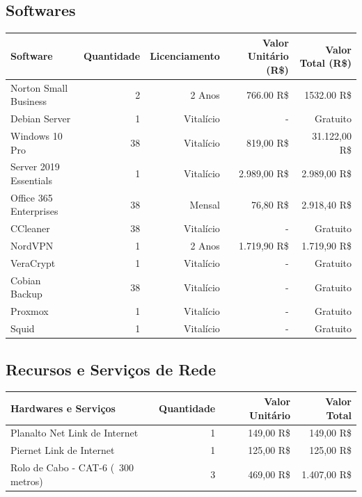 \documentclass[12pt]{article}
\begin{document}
\subsection{Softwares}

\begin{center}
\begin{tabular}{| l | r | r | r | r |}
\hline 
Software & Quantidade & Licenciamento & Valor Unitário (R\$) & Valor Total (R\$)\\
\hline
Norton Small Business & 2 & 2 Anos & 766.00 R\$ & 1532.00 R\$\\
Debian Server & 1 & Vitalício & - & Gratuito\\
Windows 10 Pro & 38 & Vitalício & 819,00 R\$ & 31.122,00 R\$\\
Server 2019 Essentials & 1 & Vitalício & 2.989,00 R\$ & 2.989,00 R\$\\
Office 365 Enterprises & 38 & Mensal & 76,80 R\$ & 2.918,40 R\$\\
CCleaner & 38 & Vitalício & - & Gratuito\\
NordVPN & 1 & 2 Anos & 1.719,90 R\$ & 1.719,90 R\$\\
VeraCrypt & 1 & Vitalício & - & Gratuito\\
Cobian Backup & 38 & Vitalício & - & Gratuito\\
Proxmox & 1 & Vitalício & - & Gratuito\\
Squid & 1 & Vitalício  & - & Gratuito\\
\hline
\end{tabular}
\end{center}
\subsection{Recursos e Serviços de Rede}
\begin{center}
\begin{tabular}{| l | r | r | r |}
\hline 
Hardwares e Serviços & Quantidade & Valor Unitário & Valor Total\\
\hline
Planalto Net Link de Internet & 1 & 149,00 R\$ & 149,00 R\$\\
Piernet Link de Internet & 1 & 125,00 R\$ & 125,00 R\$\\
Rolo de Cabo - CAT-6 (~300 metros) & 3 & 469,00 R\$ & 1.407,00 R\$\\
\hline
\end{tabular}
\end{center}
\end{document}
